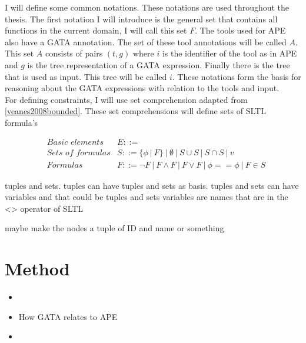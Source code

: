 \documentclass{article}
\begin{document}
I will define some common notations. These notations are used throughout the thesis. The first notation I will introduce is the general set that contains all functions in the current domain, I will call this set $F$. The tools used for APE also have a GATA annotation. The set of these tool annotations will be called $A$. This set $A$ consists of pairs $(t,g)$ where $i$ is the identifier of the tool as in APE and $g$ is the tree representation of a GATA expression. Finally there is the tree that is used as input. This tree will be called $i$. These notations form the basis for reasoning about the GATA expressions with relation to the tools and input.
\\

For defining constraints, I will use set comprehension adapted from \ref{veanes2008bounded}. These set comprehensions will define sets of SLTL formula's 

\begin{align*}
&\textit{Basic elements}  & E::=   \\
    &\textit{Sets of formulas}  & S ::= \{\phi\ |\ F \}\ |\ \emptyset\ |\ S \cup S\ |\ S\cap S\ |\ v   \\
    &Formulas & F ::= \neg F \ |\ F \wedge F\ |\ F \vee F\ |\ \phi == \phi \ |\ F \in S
\end{align*}

tuples and sets.
tuples can have tuples and sets as basis. 
tuples and sets can have variables and that could be tuples and sets
variables are names that are in the <> operator of SLTL 

maybe make the nodes a tuple of ID and name or something






\section{Method}
\begin{itemize}
    \item 
    \item How GATA relates to APE
    \item  
\end{itemize}
\end{document}
